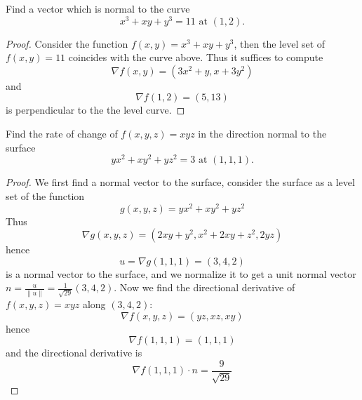 \documentclass[openany]{book}
\begin{document}
\begin{prob}[2.6, Q6]
Find a vector which is normal to the curve  
\[
x^3 + xy + y^3 = 11 \text{ at } (1, 2).
\]
\end{prob}
\begin{proof}
    Consider the function $f(x,y)=x^3+xy+y^3$, then the level set of $f(x,y)=11$ coincides with the curve above. Thus it suffices to compute 
    \begin{equation*}
        \nabla f(x,y)=(3x^2+y, x+3y^2)
    \end{equation*}
    and 
    \begin{equation*}
        \nabla f(1,2)=(5, 13)
    \end{equation*}
    is perpendicular to the the level curve.
\end{proof}



\begin{prob}[2.6, Q7]
Find the rate of change of \( f(x, y, z) = xyz \) in the direction normal to the surface  
\[
yx^2 + xy^2 + yz^2 = 3 \text{ at } (1, 1, 1).
\]
\end{prob}





\begin{proof}
    We first find a normal vector to the surface, consider the surface as a level set of the function 
    \begin{equation*}
        g(x,y,z)=yx^2+xy^2+yz^2
    \end{equation*}
    Thus 
    \begin{equation*}
        \nabla g(x,y,z)=(2xy+y^2, x^2+2xy+z^2, 2yz)
    \end{equation*}
    hence 
    \begin{equation*}
        u=\nabla g(1,1,1)=(3, 4, 2)
    \end{equation*}
    is a normal vector to the surface, and we normalize it to get a unit normal vector $n=\frac{u}{\|u\|}=\frac{1}{\sqrt{29}}(3,4,2)$. Now we find the directional derivative of $f(x,y,z)=xyz$ along $(3,4,2)$:
    \begin{equation*}
        \nabla f(x,y,z)=(yz, xz, xy)
    \end{equation*}
    hence 
    \begin{equation*}
        \nabla f(1,1,1)=(1,1,1)
    \end{equation*}
    and the directional derivative is 
    \begin{equation*}
        \nabla f(1,1,1)\cdot n=\frac{9}{\sqrt{29}}
    \end{equation*}
\end{proof}
\end{document}
